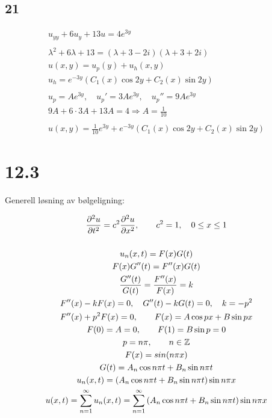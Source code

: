 \subsection*{21}


\begin{gather*}
	u_{yy} + 6 u_y + 13 u = 4 e^{3 y}
	\\
	\\
	\lambda^2 + 6 \lambda + 13 = (\lambda + 3 - 2 i) (\lambda + 3 + 2 i)
	\\
	u(x, y) = u_p(y) + u_h(x, y)
	\\
	u_h = e^{-3 y} \left(
		C_1(x) \cos{2 y} + C_2(x) \sin{2 y}
	\right)
	\\
	\\
	u_p = A e^{3 y}, \quad u_p' = 3 A e^{3 y}, \quad u_p'' = 9 A e^{3 y}
	\\
	9 A + 6 \cdot 3 A + 13 A = 4 \Rightarrow A = \frac{1}{10}
	\\
	\\
	u(x, y) = \frac{1}{10} e^{3 y} + e^{-3 y} \left(
		C_1(x) \cos{2 y} + C_2(x) \sin{2 y}
	\right)
\end{gather*}


\newpage


\section*{12.3}

Generell løsning av bølgeligning:

\begin{gather*}
	\frac{\partial^{2} u}{\partial t^{2}} = c^2 \frac{\partial^{2} u}{\partial x^{2}},
	\qquad
	c^2 = 1, \quad 0 \leq x \leq 1
	\\
	\\
	u_n(x, t) = F(x) G(t)
	\\
	F(x) G''(t) = F''(x) G(t)
	\\
	\frac{G''(t)}{G(t)} = \frac{F''(x)}{F(x)} = k
	\\
	F''(x) - k F(x) = 0, \quad G''(t) - k G(t) = 0, \quad
	k = -p^2
	\\
	F''(x) + p^2 F(x) = 0, \qquad
	F(x) = A \cos{p x} + B \sin{p x}
	\\
	F(0) = A = 0, \qquad
	F(1) = B \sin{p} = 0
	\\
	p = n \pi, \qquad n \in \mathbb{Z}
	\\
	F(x) = sin(n \pi x)
	\\
	G(t) = A_n \cos{n \pi t} + B_n \sin{n \pi t}
	\\
	u_n(x, t) = \left(
		A_n \cos{n \pi t} + B_n \sin{n \pi t}
	\right) \sin{n \pi x}
	\\
	u(x, t) = \sum_{n = 1}^\infty{u_n(x, t)}
	=
	\sum_{n = 1}^\infty{\left(
		A_n \cos{n \pi t} + B_n \sin{n \pi t}
	\right) \sin{n \pi x}}
\end{gather*}


